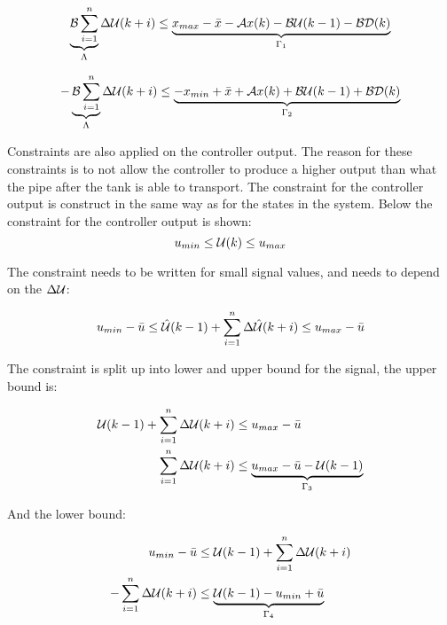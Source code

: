  \begin{equation}
         \underbrace{\CMcal{B}\sum_{i=1}^n}_{\Lambda} \Delta\CMcal{U}(k+i)\leq \underbrace{x_{max}- \bar{x}-\CMcal{A}x(k)-\CMcal{B}\CMcal{U}(k-1)-\CMcal{B}\CMcal{D}(k)}_{\Gamma_1}
 \end{equation}  

 \begin{equation}
    -\underbrace{\CMcal{B}\sum_{i=1}^n}_{\Lambda} \Delta\CMcal{U}(k+i) \leq \underbrace{-x_{min}+\bar{x}+\CMcal{A}x(k)+\CMcal{B}\CMcal{U}(k-1)+\CMcal{B}\CMcal{D}(k)}_{\Gamma_2}
 \end{equation}


Constraints are also applied on the controller output. The reason for these constraints is to not allow the controller to produce a higher output than what the pipe after the tank is able to transport. The constraint for the controller output is construct in the same way as for the states in the system. Below the constraint for the controller output is shown:  
 \begin{equation}
 	u_{min} \leq \CMcal{U}(k) \leq u_{max}
 \end{equation}

The constraint needs to be written for small signal values, and needs to depend on the $\Delta \CMcal{U}$:

 \begin{equation}
 		u_{min} -  \bar{u} \leq \hat{\CMcal{U}}(k-1)+\sum_{i=1}^n \Delta\hat{\CMcal{U}}(k+i)  \leq  u_{max} -  \bar{u}
 \end{equation}

The constraint is split up into lower and upper bound for the signal, the upper bound is:

 \begin{equation}
 \begin{aligned}
			 	\CMcal{U}(k-1)+\sum_{i=1}^n \Delta\CMcal{U}(k+i)  &\leq  u_{max} -  \bar{u} \\
				\sum_{i=1}^n \Delta\CMcal{U}(k+i)  &\leq  \underbrace{u_{max} -  \bar{u} - \CMcal{U}(k-1)}_{\Gamma_3} \\
 \end{aligned}
 \end{equation}



And the lower bound:

 \begin{equation}
 \begin{aligned}
			 	u_{min} -  \bar{u} &\leq \CMcal{U}(k-1)+\sum_{i=1}^n \Delta\CMcal{U}(k+i) \\
-\sum_{i=1}^n \Delta\CMcal{U}(k+i) &\leq \underbrace{\CMcal{U}(k-1)-u_{min}+\bar{u}}_{\Gamma_4}
 \end{aligned}
 \end{equation}

